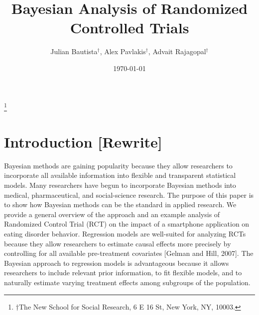 \documentclass{article}
\title{Bayesian Analysis of Randomized Controlled Trials}
\author{Julian Bautista$^\dag$, Alex Pavlakis$^\dag$, Advait Rajagopal$^\dag$}
\date{\today}
\newcommand\blfootnote[1]{%
  \begingroup
  \renewcommand\thefootnote{}\footnote{#1}%
  \addtocounter{footnote}{-1}%
  \endgroup
}
\begin{document}
\maketitle
\blfootnote{$\dag$The New School for Social Research, 6 E 16 St, New York, NY, 10003.}

\newpage

\section{Introduction [Rewrite]}
Bayesian methods are gaining popularity because they allow researchers to incorporate all available information into flexible and transparent statistical models.  Many researchers have begun to incorporate Bayesian methods into medical, pharmaceutical, and social-science research.  The purpose of this paper is to show how Bayesian methods can be the standard in applied research.  We provide a general overview of the approach and an example analysis of Randomized Control Trial (RCT) on the impact of a smartphone application on eating disorder behavior. 
Regression models are well-suited for analyzing RCTs because they allow researchers to estimate causal effects more precisely by controlling for all available pre-treatment covariates [Gelman and Hill, 2007].  The Bayesian approach to regression models is advantageous because it allows researchers to include relevant prior information, to fit flexible models, and to naturally estimate varying treatment effects among subgroups of the population.
\end{document}
